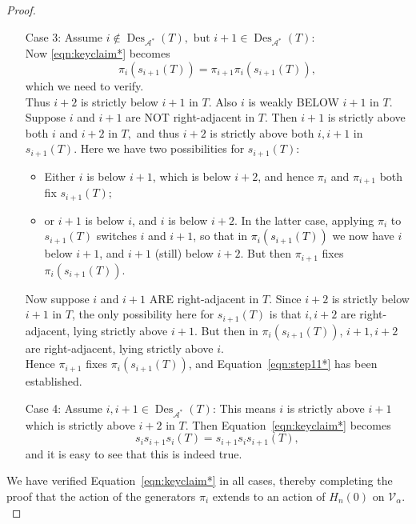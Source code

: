 \documentclass[12pt,letterpaper]{amsart}
\newcommand{\svw}{\textcolor{black}}
\theoremstyle{definition}
\DeclareMathOperator{\Des}{Des}
\begin{document}
\begin{proof}
\begin{enumerate}
\\
\item[Case 3:]  Assume $i\notin \Des_{\mathcal{A}^*}(T), \text{ but }i+1\in \Des_{\mathcal{A}^*}(T)$:   
\\
Now \eqref{eqn:keyclaim*} becomes 
\begin{equation}\label{eqn:step11*}\pi_i(s_{i+1}(T))= \pi_{i+1}\pi_i(s_{i+1}(T)),
\end{equation}
which we need to verify. 
\\
Thus  $i+2$ is strictly below $i+1$ in $T.$ Also $i$ is  weakly BELOW $i+1$ in $T$. 
\\
Suppose $i$ and $i+1$ are NOT right-adjacent in $T$.  Then  $i+1$ is strictly above both $i$ and $i+2$ in $T,$ and thus  $i+2$ is strictly above both $i,i+1$ in $s_{i+1}(T).$  Here we have  two possibilities for $s_{i+1}(T)$:
\begin{itemize}
\item
 Either $i$ is below $i+1$, which is below $i+2$, and hence 
$\pi_i$ and $\pi_{i+1}$ both fix $s_{i+1}(T);$
\item
or $i+1$ is below $i$, and $i$ is below $i+2$.  In the latter case, applying $\pi_i$ to $s_{i+1}(T)$ switches $i$ and $i+1$, so that in \svw{$\pi_i(s_{i+1}(T))$} we now have $i$ below $i+1$, and $i+1$ (still) below $i+2$.  But then $\pi_{i+1}$ fixes $\pi_i(s_{i+1}(T))$.
\end{itemize}
Now suppose $i$ and $i+1$ ARE right-adjacent in $T$.  Since $i+2$ is strictly below $i+1$ in $T$, the only possibility here for $s_{i+1}(T)$ is that $i, i+2$ are 
right-adjacent, lying strictly above $i+1.$ But then in $\pi_i(s_{i+1}(T))$, 
$i+1, i+2$ are 
right-adjacent, lying strictly above $i.$ 
\\
Hence $\pi_{i+1}$ fixes 
$\pi_i(s_{i+1}(T))$, and 
  Equation~\eqref{eqn:step11*} has been established.
\item[Case 4:] Assume $i, i+1\in \Des_{\mathcal{A}^*}(T)$:   This means $i$ is strictly above $i+1$ which is strictly above $i+2$ in $T$.
 Then Equation~\eqref{eqn:keyclaim*} becomes 
\begin{equation}\label{eqn:step4*} s_i s_{i+1} s_i(T) = s_{i+1} s_i s_{i+1}(T), \end{equation}
and it is easy to see that this is indeed true.  
\end{enumerate}
We have verified Equation~\eqref{eqn:keyclaim*} in all cases, thereby completing the proof that the action of the generators $\pi_i$ extends to an action of $H_n(0)$ on $\mathcal{V}_\alpha.$ 
\end{proof}    
\end{document}
